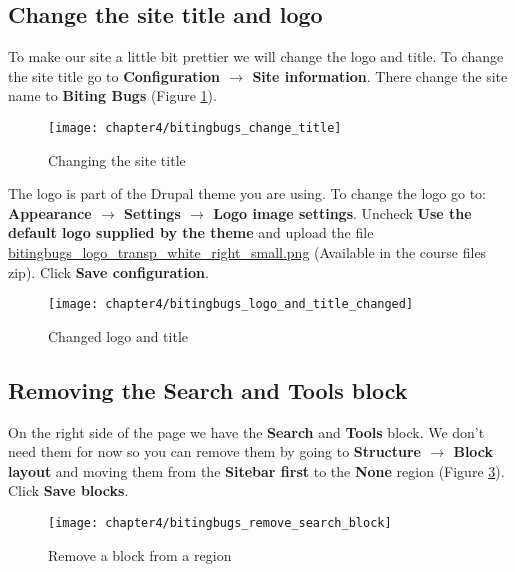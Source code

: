   \subsection{Change the site title and logo}
  
  To make our site a little bit prettier we will change the logo and title. To change the site title go to \textbf{Configuration $\rightarrow$ Site information}. There change the site name to \textbf{Biting Bugs} (Figure \ref{fig:bitingbugs_change_title}).
  
  \begin{figure}[H]
  	\centering
  	\texttt{[image: chapter4/bitingbugs\_change\_title]}
  	\caption{Changing the site title}
  	\label{fig:bitingbugs_change_title}
  \end{figure}
  
  The logo is part of the Drupal theme you are using. To change the logo go to: \textbf{Appearance $\rightarrow$ Settings $\rightarrow$ Logo image settings}. Uncheck \textbf{Use the default logo supplied by the theme} and upload the file \url{bitingbugs_logo_transp_white_right_small.png} (Available in the course files zip). Click \textbf{Save configuration}.
  
  
  
  \begin{figure}[H]
  	\centering
  	\texttt{[image: chapter4/bitingbugs\_logo\_and\_title\_changed]}
  	\caption{Changed logo and title}
  	\label{fig:bitingbugs_logo_and_title_changed}
  \end{figure}
  
  \subsection{Removing the Search and Tools block}
  
  On the right side of the page we have the \textbf{Search} and \textbf{Tools} block. We don't need them for now so you can remove them by going to \textbf{Structure $\rightarrow$ Block layout} and moving them from the \textbf{Sitebar first} to the \textbf{None} region (Figure \ref{fig:bitingbugs_remove_search_block}). Click \textbf{Save blocks}.
  
  \begin{figure}[H]
  	\centering
  	\texttt{[image: chapter4/bitingbugs\_remove\_search\_block]}
  	\caption{Remove a block from a region}
  	\label{fig:bitingbugs_remove_search_block}
  \end{figure}
  
